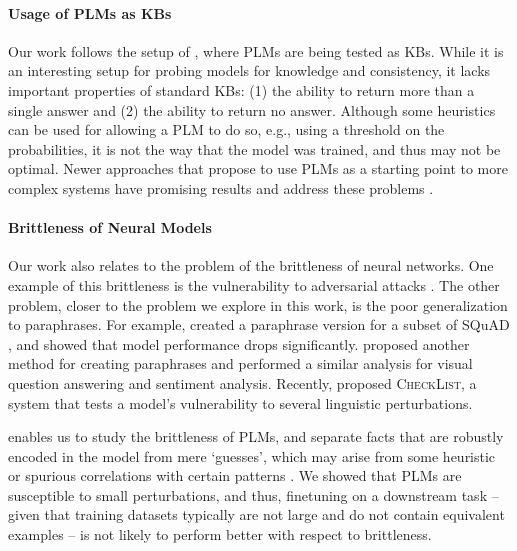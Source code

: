 \paragraph{Usage of PLMs as KBs}
Our work follows the setup of \citet{lama,alpaqa}, where PLMs are being tested as KBs. While it is an interesting setup for probing models for knowledge and consistency, it lacks important properties of standard KBs: (1) the ability to return more than a single answer and (2) the ability to return no answer.
Although some heuristics can be used for allowing a PLM to do so, e.g., using a threshold on the probabilities, it is not the way that the model was trained, and thus may not be optimal.
Newer approaches that propose to use PLMs as a starting point to more complex systems have promising results and address these problems \cite{thorne2020neural}.


\paragraph{Brittleness of Neural Models}
Our work also relates to the problem of the brittleness of neural networks. One example of this brittleness is the vulnerability to adversarial attacks \cite{adversarial_attacks,jia2017adversarial}.
The other problem, closer to the problem we explore in this work, is the poor generalization to paraphrases.
For example, \citet{squad-paraphrase} created a paraphrase version for a subset of SQuAD \cite{squad}, and showed that model performance drops significantly. 
\citet{ribeiro2018semantically} proposed another method for
creating paraphrases and performed a similar analysis for
visual question answering and sentiment analysis. Recently,
\citet{ribeiro-etal-2020-beyond} proposed
\textsc{CheckList}, a system that tests a model's vulnerability to several linguistic perturbations.

\resource{} enables us to study the brittleness of PLMs, and
separate  facts that are robustly encoded in the model from
mere `guesses', which may arise from some heuristic or
spurious correlations with certain patterns
\cite{poerner2020bert}. We showed that PLMs are susceptible
to small perturbations, and thus, finetuning on a
downstream task -- given that training datasets  typically are not
large and  do not contain equivalent examples -- is not
likely to perform better with respect to brittleness.


